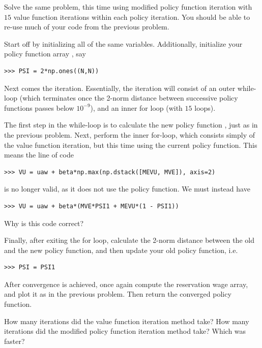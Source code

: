 \begin{problem}
Solve the same problem, this time using modified policy function iteration with $15$ value function iterations
within each policy iteration.  You should be able to re-use much of your code from the previous problem.

Start off by initializing all of the same variables. Additionally, initialize your policy function array ,
say
\begin{lstlisting}
>>> PSI = 2*np.ones((N,N))
\end{lstlisting}

Next comes the iteration.
Essentially, the iteration will consist of an outer while-loop (which terminates once the 2-norm distance
between successive policy functions passes below $10^{-9}$), and an inner for loop (with $15$ loops).


The first step in the while-loop is to calculate the new policy function , just as in the previous
problem. Next, perform the inner for-loop, which consists simply of the value function iteration, but this
time using the current policy function. This means the line of code
\begin{lstlisting}
>>> VU = uaw + beta*np.max(np.dstack([MEVU, MVE]), axis=2)
\end{lstlisting}
is no longer valid, as it does not use the policy function. We must instead have
\begin{lstlisting}
>>> VU = uaw + beta*(MVE*PSI1 + MEVU*(1 - PSI1))
\end{lstlisting}
Why is this code correct?

Finally, after exiting the for loop, calculate the 2-norm distance between the old and the new policy function,
and then update your old policy function, i.e.
\begin{lstlisting}
>>> PSI = PSI1
\end{lstlisting}

After convergence is achieved, once again compute the reservation wage array, and plot it as in the previous
problem. Then return the converged policy function.
\end{problem}

\begin{problem}
How many iterations did the value function iteration method take?
How many iterations did the modified policy function iteration method take?
Which was faster?
\end{problem}
